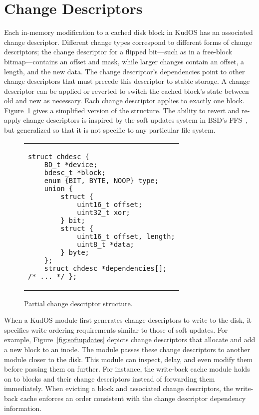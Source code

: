 \preparagraphspacing{}
\section*{Change Descriptors}
\label{sec:chdescs}

Each in-memory modification to a cached disk block in KudOS has an associated
change descriptor.
%
Different change types correspond to different forms of change descriptors;
the change descriptor for a flipped bit---such as in a free-block
bitmap---contains an offset and mask, while larger changes contain an
offset, a length, and the new data.
%
The change descriptor's dependencies point to other change descriptors that
must precede this descriptor to stable storage.
%
A change descriptor can be applied or reverted to switch the cached block's
state between old and new as necessary.
%
Each change descriptor applies to exactly one block.
%
Figure~\ref{fig:chdesc} gives
a simplified version of the structure. The ability to revert and
re-apply change descriptors is inspired by the soft updates system in
BSD's FFS~\cite{ganger00soft}, but generalized so that it is not
specific to any particular file system.

\begin{figure}
\vskip-14pt
\begin{tabular}{@{\hskip0.58in}p{2in}@{}}
\begin{scriptsize}
\begin{verbatim}
struct chdesc {
    BD_t *device;
    bdesc_t *block;
    enum {BIT, BYTE, NOOP} type;
    union {
        struct {
            uint16_t offset;
            uint32_t xor;
        } bit;
        struct {
            uint16_t offset, length;
            uint8_t *data;
        } byte;
    };
    struct chdesc *dependencies[];
/* ... */ };
\end{verbatim}
\end{scriptsize}
\end{tabular}
\vspace{-10pt}
\caption{\label{fig:chdesc} Partial change descriptor structure.}
\end{figure}

When a KudOS module first generates change descriptors to write to the disk, it
specifies write ordering requirements similar to those of soft updates. For
example, Figure~\ref{fig:softupdates} depicts change descriptors that allocate
and add a new block to an inode.
%
The module passes these change descriptors to another module closer to
the disk.  This module can inspect, delay, and even modify them before
passing them on further.
%
For instance, the write-back cache module holds on to blocks and their change
descriptors instead of forwarding them immediately.
%
When evicting a block and associated change descriptors, the write-back
cache enforces an order consistent with the change descriptor dependency
information.

